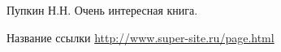 \clearpage


\begin{thebibliography}{00} %

	 Пупкин Н.Н. Очень интересная книга.

	 Название ссылки 
	\url{http://www.super-site.ru/page.html}

\end{thebibliography}